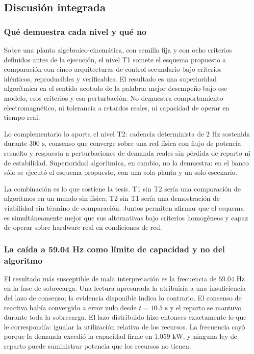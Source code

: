 \subsection{Discusión integrada}

\subsubsection{Qué demuestra cada nivel y qué no}

Sobre una planta algebraico-cinemática, con semilla fija y con ocho criterios definidos antes de la ejecución, el nivel T1 somete el esquema propuesto a comparación con cinco arquitecturas de control secundario bajo criterios idénticos, reproducibles y verificables. El resultado es una superioridad algorítmica en el sentido acotado de la palabra: mejor desempeño bajo ese modelo, esos criterios y esa perturbación. No demuestra comportamiento electromagnético, ni tolerancia a retardos reales, ni capacidad de operar en tiempo real.

Lo complementario lo aporta el nivel T2: cadencia determinista de $2\text{ Hz}$ sostenida durante $300\text{ s}$, consenso que converge sobre una red física con flujo de potencia resuelto y respuesta a perturbaciones de demanda reales sin pérdida de reparto ni de estabilidad. Superioridad algorítmica, en cambio, no la demuestra: en el banco sólo se ejecutó el esquema propuesto, con una sola planta y un solo escenario.

La combinación es lo que sostiene la tesis. T1 sin T2 sería una comparación de algoritmos en un mundo sin física; T2 sin T1 sería una demostración de viabilidad sin término de comparación. Juntos permiten afirmar que el esquema es simultáneamente mejor que sus alternativas bajo criterios homogéneos y capaz de operar sobre hardware real en condiciones de red.

\subsubsection{La caída a 59.04 Hz como límite de capacidad y no del algoritmo}

El resultado más susceptible de mala interpretación es la frecuencia de $59.04\text{ Hz}$ en la fase de sobrecarga. Una lectura apresurada la atribuiría a una insuficiencia del lazo de consenso; la evidencia disponible indica lo contrario. El consenso de reactiva había convergido a error nulo desde $t = 10.5\text{ s}$ y el reparto se mantuvo durante toda la sobrecarga. El lazo distribuido hizo entonces exactamente lo que le correspondía: igualar la utilización relativa de los recursos. La frecuencia cayó porque la demanda excedió la capacidad firme en $1.059\text{ kW}$, y ninguna ley de reparto puede suministrar potencia que los recursos no tienen.

